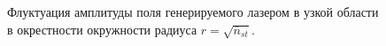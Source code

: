 \begin{figure}
\centering

\caption{Флуктуация амплитуды поля генерируемого лазером в узкой
  области в окрестности окружности радиуса $r=\sqrt{\bar{n}_{st}}$.}
\label{figPart2Ch1_7}
\end{figure}
